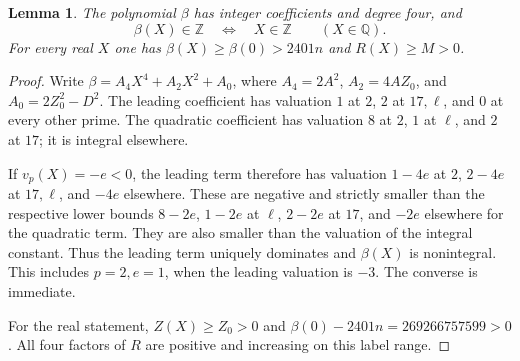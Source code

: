 \documentclass[11pt,a4paper]{article}
\newtheorem{lemma}[theorem]{Lemma}
\newcommand{\Q}{\mathbb Q}\newcommand{\Z}{\mathbb Z}
\begin{document}
\begin{lemma}\label{lem:integrality}
The polynomial $\beta$ has integer coefficients and degree four, and
\[
                  \beta(X)\in\Z\quad\Longleftrightarrow\quad X\in\Z
                  \qquad(X\in\Q).
\]
For every real $X$ one has $\beta(X)\ge\beta(0)>2401n$ and
$R(X)\ge M>0$.
\end{lemma}
\begin{proof}
Write $\beta=A_4X^4+A_2X^2+A_0$, where
$A_4=2A^2$, $A_2=4AZ_0$, and $A_0=2Z_0^2-D^2$.
The leading coefficient has valuation $1$ at $2$, $2$ at
$17,\ell$, and $0$ at every other prime. The quadratic coefficient
has valuation $8$ at $2$, $1$ at $\ell$, and $2$ at $17$;
it is integral elsewhere.

If $v_p(X)=-e<0$, the leading term therefore has valuation
$1-4e$ at $2$, $2-4e$ at $17,\ell$, and $-4e$ elsewhere.
These are negative and strictly smaller than the respective lower
bounds $8-2e$, $1-2e$ at $\ell$, $2-2e$ at $17$, and $-2e$
elsewhere for the quadratic term. They are also smaller than the
valuation of the integral constant. Thus the leading term uniquely
dominates and $\beta(X)$ is nonintegral. This includes $p=2,e=1$,
when the leading valuation is $-3$. The converse is immediate.

For the real statement, $Z(X)\ge Z_0>0$ and
$\beta(0)-2401n=269266757599>0$. All four factors of $R$ are
positive and increasing on this label range.
\end{proof}
\end{document}
